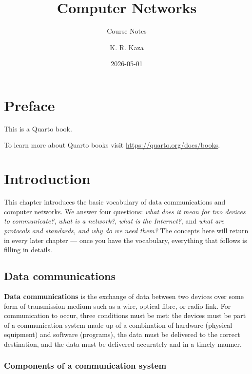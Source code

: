 \documentclass[
  letterpaper,
  DIV=11,
  numbers=noendperiod]{scrreprt}
\title{Computer Networks}
\subtitle{Course Notes}
\author{K. R. Kaza}
\date{2026-05-01}
\renewcommand*\contentsname{Table of contents}
\newcommand\contentsname{Table of contents}
\begin{document}
\maketitle

\renewcommand*\contentsname{Table of contents}
{
\setcounter{tocdepth}{2}
\tableofcontents
}


\chapter*{Preface}\label{preface}


This is a Quarto book.

To learn more about Quarto books visit
\url{https://quarto.org/docs/books}.


\chapter{Introduction}\label{introduction}

This chapter introduces the basic vocabulary of data communications and
computer networks. We answer four questions: \emph{what does it mean for
two devices to communicate?}, \emph{what is a network?}, \emph{what is
the Internet?}, and \emph{what are protocols and standards, and why do
we need them?} The concepts here will return in every later chapter ---
once you have the vocabulary, everything that follows is filling in
details.

\section{Data communications}\label{sec-data-comm}

\textbf{Data communications} is the exchange of data between two devices
over some form of transmission medium such as a wire, optical fibre, or
radio link. For communication to occur, three conditions must be met:
the devices must be part of a communication system made up of a
combination of hardware (physical equipment) and software (programs),
the data must be delivered to the correct destination, and the data must
be delivered accurately and in a timely manner.

\subsection{Components of a communication
system}\label{components-of-a-communication-system}
\end{document}
